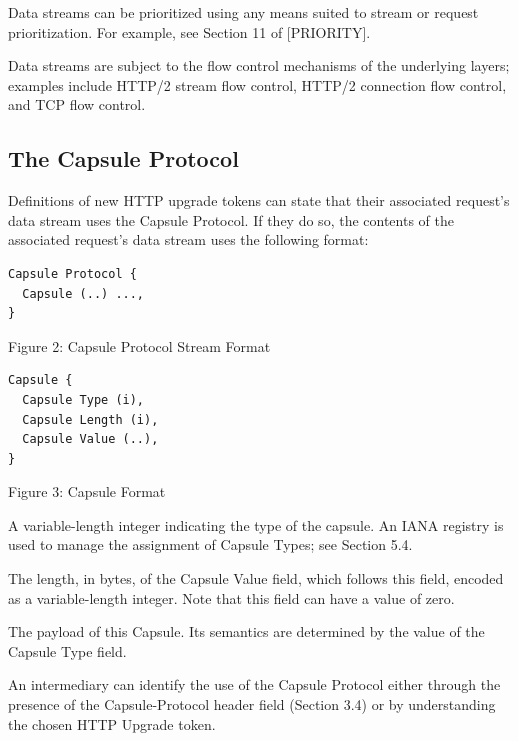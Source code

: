 \documentclass{article}
\begin{document}
Data streams can be prioritized using any means suited to stream or
request prioritization.  For example, see Section 11 of [PRIORITY].

Data streams are subject to the flow control mechanisms of the
underlying layers; examples include HTTP/2 stream flow control,
HTTP/2 connection flow control, and TCP flow control.

\subsection{The Capsule Protocol}

Definitions of new HTTP upgrade tokens can state that their
associated request's data stream uses the Capsule Protocol.  If they
do so, the contents of the associated request's data stream uses the
following format:

\begin{verbatim}
Capsule Protocol {
  Capsule (..) ...,
}
\end{verbatim}

\begin{center}
Figure 2: Capsule Protocol Stream Format
\end{center}

\begin{verbatim}
Capsule {
  Capsule Type (i),
  Capsule Length (i),
  Capsule Value (..),
}
\end{verbatim}

\begin{center}
Figure 3: Capsule Format
\end{center}

\begin{description}[style=unboxed, leftmargin=0.5cm]
\item[Capsule Type:]  A variable-length integer indicating the type of the
   capsule.  An IANA registry is used to manage the assignment of
   Capsule Types; see Section 5.4.

\item[Capsule Length:]  The length, in bytes, of the Capsule Value field,
   which follows this field, encoded as a variable-length integer.
   Note that this field can have a value of zero.

\item[Capsule Value:]  The payload of this Capsule.  Its semantics are
   determined by the value of the Capsule Type field.
\end{description}

An intermediary can identify the use of the Capsule Protocol either
through the presence of the Capsule-Protocol header field
(Section 3.4) or by understanding the chosen HTTP Upgrade token.
\end{document}
